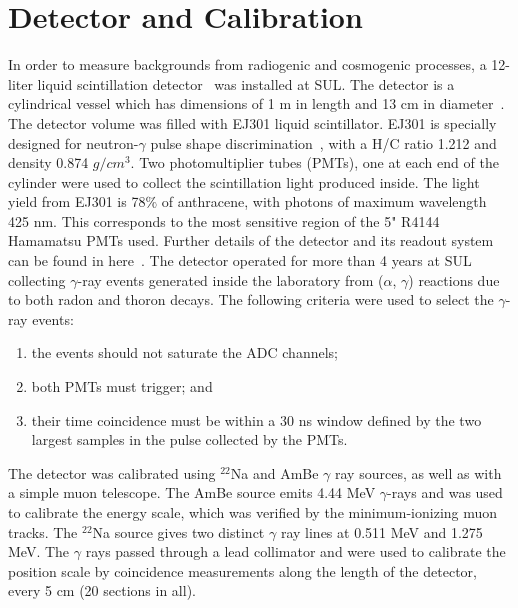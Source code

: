 \documentclass[aps,prc,showpacs,twocolumn,superscriptaddress]{revtex4-1}
\begin{document}
\section{Detector and Calibration}
In order to measure backgrounds from radiogenic and cosmogenic processes, a 12-liter liquid scintillation detector~\cite{cmei} was installed at SUL. The detector is a cylindrical vessel which has dimensions of 1 m in length and 13 cm in diameter~\cite{zhang}. The detector volume was filled with  EJ301 liquid scintillator.  EJ301 is specially designed for neutron-$\gamma$ pulse shape discrimination~\cite{knoll}, with a H/C ratio 1.212 and density 0.874 $g/cm^3$.  Two photomultiplier tubes (PMTs), one at each end of the cylinder were used to collect the scintillation light produced inside. The light yield from EJ301 is 78$\%$  of anthracene, with photons of maximum wavelength 425 nm. This corresponds to the most sensitive region of the 5" R4144 Hamamatsu PMTs used. Further details of the detector and its readout system can be found in here~\cite{cmei}.  The detector operated for more than 4 years at SUL collecting $\gamma$-ray events generated inside the laboratory from ($\alpha$, $\gamma$) reactions due to both radon and thoron decays. The following criteria were used to select the $\gamma$-ray events:
\begin{enumerate}
\item {the events should not saturate the ADC channels;}
\item {both PMTs must trigger; and}
\item {their time coincidence must be within a 30 ns window defined by the two largest samples in the pulse collected by the PMTs.}
\end{enumerate}

The detector was calibrated using $^{22}$Na and AmBe $\gamma$ ray sources, as well as with a simple muon telescope. The AmBe source emits 4.44 MeV $\gamma$-rays and was used to calibrate the energy scale, which was verified by the minimum-ionizing muon tracks. The $^{22}$Na source gives two distinct $\gamma$ ray lines at 0.511 MeV and 1.275 MeV.  The $\gamma$ rays passed through a lead collimator and were used to calibrate the position scale by coincidence measurements along the length of the detector, every 5 cm (20 sections in all).  
\end{document}
